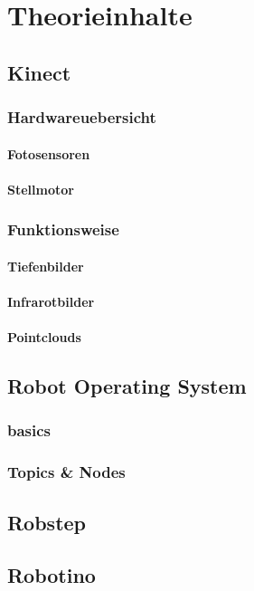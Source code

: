 
\chapter{Theorieinhalte}
	\section{Kinect}
		\subsection{Hardwareuebersicht}
			\subsubsection{Fotosensoren}
			\subsubsection{Stellmotor}
		\subsection{Funktionsweise}
			\subsubsection{Tiefenbilder}
			\subsubsection{Infrarotbilder}
			\subsubsection{Pointclouds}
	\section{Robot Operating System}
		\subsection{basics}
		\subsection{Topics \& Nodes}
	\section{Robstep}
	\section{Robotino}